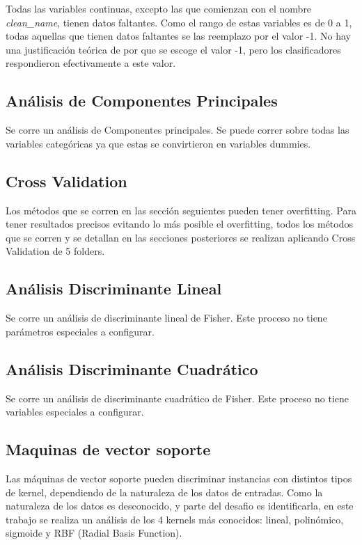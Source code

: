 \documentclass[journal]{IEEEtran}
\begin{document}
Todas las variables continuas, excepto las que comienzan con el
nombre \textit{clean\_name}, tienen datos faltantes. Como el rango
de estas variables es de 0 a 1, todas aquellas que tienen datos
faltantes se las reemplazo por el valor -1. No hay una justificación
teórica de por que se escoge el valor -1, pero los clasificadores
respondieron efectivamente a este valor.

\subsection{Análisis de Componentes Principales}
Se corre un análisis de Componentes principales. Se puede correr sobre
todas las variables categóricas ya que estas se convirtieron en 
variables dummies.

\subsection{Cross Validation}
Los métodos que se corren en las sección seguientes pueden tener overfitting. Para
tener resultados precisos evitando lo más posible el overfitting, todos los
métodos que se corren y se detallan en las secciones posteriores se realizan
aplicando Cross Validation de 5 folders.

\subsection{Análisis Discriminante Lineal}
Se corre un análisis de discriminante lineal de Fisher. Este proceso no 
tiene parámetros especiales a configurar.

\subsection{Análisis Discriminante Cuadrático}
Se corre un análisis de discriminante cuadrático de Fisher. Este proceso
no tiene variables especiales a configurar.

\subsection{Maquinas de vector soporte}
Las máquinas de vector soporte pueden discriminar instancias con distintos
tipos de kernel, dependiendo de la naturaleza de los datos de entradas. Como
la naturaleza de los datos es desconocido, y parte del desafio es identificarla,
en este trabajo se realiza un análisis de los 4 kernels más conocidos: lineal,
polinómico, sigmoide y RBF (Radial Basis Function).
\end{document}
